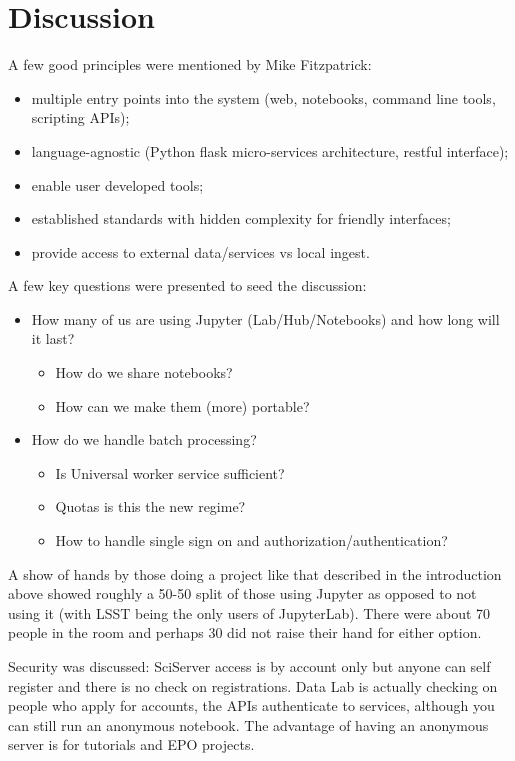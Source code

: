 \documentclass[11pt,twoside]{article}
\begin{document}
\section{Discussion}

A few good principles were mentioned by Mike Fitzpatrick:
\begin{itemize}
\item multiple entry points into the system (web, notebooks, command line tools, scripting APIs);
\item language-agnostic (Python flask micro-services architecture, restful interface);
\item  enable user developed tools;
\item  established standards with hidden complexity for friendly interfaces;
\item  provide access to external data/services vs local ingest.
\end{itemize}


A few key questions were presented to seed the discussion:
\begin{itemize}
\item How many of us are using Jupyter (Lab/Hub/Notebooks) and how long will it last?
        \begin{itemize}
        \item How do we share notebooks?
        \item How can we make them (more) portable?
        \end{itemize}
\item How do we handle batch processing?
        \begin{itemize}
        \item Is Universal worker service sufficient?
        \item Quotas is this the new regime?
        \item How to handle single sign on and authorization/authentication?
        \end{itemize}

\end{itemize}


A show of hands by those doing a project like that described in the introduction above  showed roughly a 50-50 split of those using Jupyter as opposed to not using it (with LSST being the only users of JupyterLab). There were about 70 people in the room and perhaps 30 did not raise their hand for either option.

Security was discussed:
SciServer access is by account only but anyone can self register and there is no check on registrations.
Data Lab  is actually checking on people who apply for accounts, the APIs authenticate to services, although you can still run an anonymous notebook. The advantage of having an anonymous server is for tutorials and EPO projects.
\end{document}
